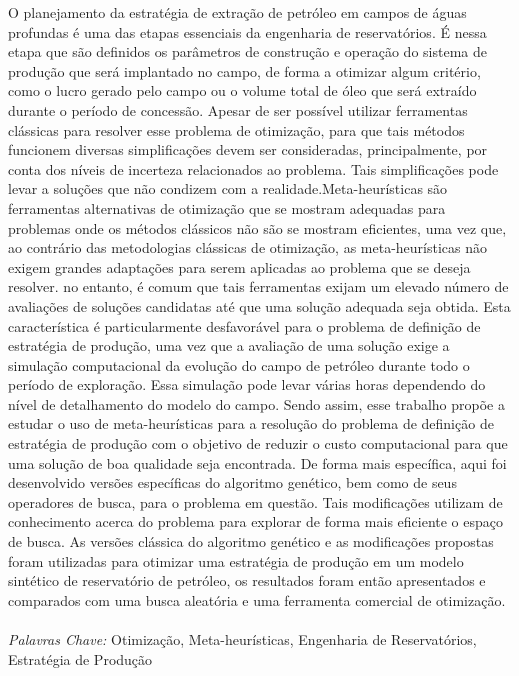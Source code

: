 \documentclass[Portugues,Final]{tese-FT}
\begin{document}
        \begin{resumo}
        O planejamento da estratégia de extração de petróleo em campos de águas profundas é uma das etapas essenciais da engenharia de reservatórios. É nessa etapa que são definidos os parâmetros de construção e operação do sistema de produção que será implantado no campo, de forma a otimizar algum critério, como o lucro gerado pelo campo ou o volume total de óleo que será extraído durante o período de concessão. Apesar de ser possível utilizar ferramentas clássicas para resolver esse problema de otimização, para que tais métodos funcionem diversas simplificações devem ser consideradas, principalmente, por conta dos níveis de incerteza relacionados ao problema. Tais simplificações pode levar a soluções que não condizem com a realidade.Meta-heurísticas são ferramentas alternativas de otimização que se mostram adequadas para problemas onde os métodos clássicos não são se mostram eficientes, uma vez que, ao contrário das metodologias clássicas de otimização, as meta-heurísticas não exigem grandes adaptações para serem aplicadas ao problema que se deseja resolver. no entanto, é comum que tais ferramentas exijam um elevado número de avaliações de soluções candidatas até que uma solução adequada seja obtida. Esta característica é particularmente desfavorável para o problema de definição de estratégia de produção, uma vez que a avaliação de uma solução exige a simulação computacional da evolução do campo de petróleo durante todo o período de exploração. Essa simulação pode levar várias horas dependendo do nível de detalhamento do modelo do campo. Sendo assim, esse trabalho propõe a estudar o uso de meta-heurísticas para a resolução do problema de definição de estratégia de produção com o objetivo de reduzir o custo computacional para que uma solução de boa qualidade seja encontrada. De forma mais específica, aqui foi desenvolvido versões específicas do algoritmo genético, bem como de seus operadores de busca, para o problema em questão. Tais modificações utilizam de conhecimento acerca do problema para explorar de forma mais eficiente o espaço de busca. As versões clássica do algoritmo genético e as modificações propostas foram utilizadas para otimizar uma estratégia de produção em um modelo sintético de reservatório de petróleo, os resultados foram então apresentados e comparados com uma busca aleatória e uma ferramenta comercial de otimização.
        \\ \\ 
        \textit{Palavras Chave:} Otimização, Meta-heurísticas, Engenharia de Reservatórios, Estratégia de Produção
        \end{resumo}
        
\end{document}
